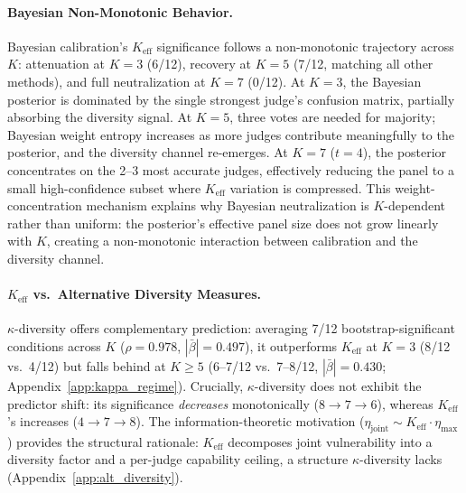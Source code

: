 \paragraph{Bayesian Non-Monotonic Behavior.}
Bayesian calibration's $K_{\mathrm{eff}}$ significance follows a non-monotonic trajectory across $K$: attenuation at $K{=}3$ (6/12), recovery at $K{=}5$ (7/12, matching all other methods), and full neutralization at $K{=}7$ (0/12). At $K{=}3$, the Bayesian posterior is dominated by the single strongest judge's confusion matrix, partially absorbing the diversity signal. At $K{=}5$, three votes are needed for majority; Bayesian weight entropy increases as more judges contribute meaningfully to the posterior, and the diversity channel re-emerges. At $K{=}7$ ($t{=}4$), the posterior concentrates on the 2--3 most accurate judges, effectively reducing the panel to a small high-confidence subset where $K_{\mathrm{eff}}$ variation is compressed. This weight-concentration mechanism explains why Bayesian neutralization is $K$-dependent rather than uniform: the posterior's effective panel size does not grow linearly with $K$, creating a non-monotonic interaction between calibration and the diversity channel.

\paragraph{$K_{\mathrm{eff}}$ vs.\ Alternative Diversity Measures.}
$\kappa$-diversity \citep{kuncheva2003measures} offers complementary prediction: averaging 7/12 bootstrap-significant conditions across $K$ ($\rho{=}0.978$, $|\bar{\beta}|{=}0.497$), it outperforms $K_{\mathrm{eff}}$ at $K{=}3$ (8/12 vs.\ 4/12) but falls behind at $K{\geq}5$ (6--7/12 vs.\ 7--8/12, $|\bar{\beta}|{=}0.430$; Appendix~\ref{app:kappa_regime}). Crucially, $\kappa$-diversity does not exhibit the predictor shift: its significance \emph{decreases} monotonically ($8 \to 7 \to 6$), whereas $K_{\mathrm{eff}}$'s increases ($4 \to 7 \to 8$). The information-theoretic motivation ($\eta_{\mathrm{joint}} \sim K_{\mathrm{eff}} \cdot \eta_{\max}$) provides the structural rationale: $K_{\mathrm{eff}}$ decomposes joint vulnerability into a diversity factor and a per-judge capability ceiling, a structure $\kappa$-diversity lacks (Appendix~\ref{app:alt_diversity}).
